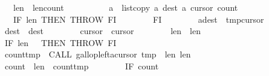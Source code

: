 \begin{isabellebody}
\ \ \ \ \ \ \ \ \ \ {\isasymacute}len{}\ {\isacharcolon}{\isacharequal}{\isacharequal}\ {\isasymacute}len{}{\isacharminus}{\isasymacute}count{}{\isacharsemicolon}{\isacharsemicolon}\isanewline
\ \ \ \ \ \ \ \ \ \ {\isasymacute}a\ {\isacharcolon}{\isacharequal}{\isacharequal}\ list{\isacharunderscore}copy\ {\isasymacute}a\ {\isacharparenleft}{\isasymacute}dest{\isacharplus}{}{\isacharparenright}\ {\isasymacute}a\ {\isacharparenleft}{\isasymacute}cursor{}{\isacharplus}{}{\isacharparenright}\ {\isasymacute}count{}{\isacharsemicolon}{\isacharsemicolon}\isanewline
\ \ \ \ \ \ \ \ \ \ IF\ {\isasymacute}len{}{\isacharequal}{}\ THEN\ THROW\ FI\isanewline
\ \ \ \ \ \ \ \ FI{\isacharsemicolon}{\isacharsemicolon}\isanewline
\ \ \ \ \ \ \ \ {\isasymacute}a{\isacharbang}{\isasymacute}dest\ {\isacharcolon}{\isacharequal}{\isacharequal}\ {\isasymacute}tmp{\isacharbang}{\isasymacute}cursor{}{\isacharsemicolon}{\isacharsemicolon}\isanewline
\ \ \ \ \ \ \ \ {\isasymacute}dest\ {\isacharcolon}{\isacharequal}{\isacharequal}\ {\isasymacute}dest{\isacharminus}{}{\isacharsemicolon}{\isacharsemicolon}\isanewline
\ \ \ \ \ \ \ \ {\isasymacute}cursor{}\ {\isacharcolon}{\isacharequal}{\isacharequal}\ {\isasymacute}cursor{}{\isacharminus}{}{\isacharsemicolon}{\isacharsemicolon}\isanewline
\ \ \ \ \ \ \ \ {\isasymacute}len{}\ {\isacharcolon}{\isacharequal}{\isacharequal}\ {\isasymacute}len{}{\isacharminus}{}{\isacharsemicolon}{\isacharsemicolon}\isanewline
\ \ \ \ \ \ \ \ IF\ {\isasymacute}len{}\ {\isacharequal}\ {}\ THEN\ THROW\ FI{\isacharsemicolon}{\isacharsemicolon}\isanewline
\isanewline
\ \ \ \ \ \ \ \ {\isasymacute}count{\isacharunderscore}tmp\ {\isacharcolon}{\isacharequal}{\isacharequal}\ CALL\ gallop{\isacharunderscore}left{\isacharparenleft}{\isasymacute}a{\isacharbang}{\isasymacute}cursor{}{\isacharcomma}\ {\isasymacute}tmp{\isacharcomma}\ {}{\isacharcomma}\ {\isasymacute}len{}{\isacharcomma}\ {\isacharparenleft}{\isasymacute}len{}{\isacharminus}{}{\isacharparenright}{\isacharparenright}{\isacharsemicolon}{\isacharsemicolon}\isanewline
\ \ \ \ \ \ \ \ {\isasymacute}count{}\ {\isacharcolon}{\isacharequal}{\isacharequal}\ {\isasymacute}len{}\ {\isacharminus}\ {\isasymacute}count{\isacharunderscore}tmp{\isacharsemicolon}{\isacharsemicolon}\isanewline
\ \ \ \ \ \ \ \ IF\ {\isasymacute}count{}\ {\isasymnoteq}\ {}\isanewline

\end{isabellebody}
